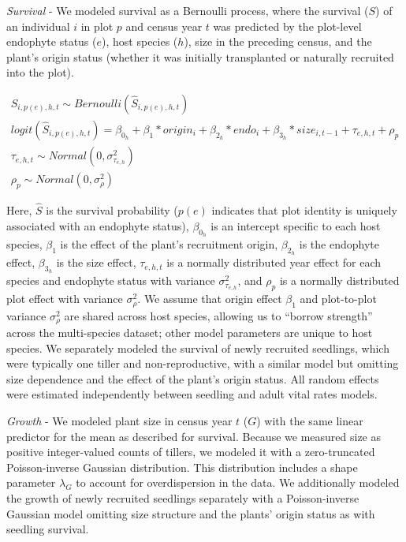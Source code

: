 \documentclass[12pt]{article}
\begin{document}
\emph{Survival} - We modeled survival as a Bernoulli process, where the survival ($S$) of an individual $i$ in plot $p$ and census year $t$ was predicted by the plot-level endophyte status ($e$), host species ($h$), size in the preceding census, and the plant's origin status (whether it was initially transplanted or naturally recruited into the plot).

\begin{subequations}
	\label{eq:survival}
	\begin{align}
	    S_{i,p(e),h,t} \sim Bernoulli(\hat{S}_{i,p(e),h,t})\\
	    logit(\hat{S}_{i,p(e),h,t}) = \beta_{0_{h}} + \beta_{1}*origin_{i} + \beta_{2_{h}}*endo_{i} + \beta_{3_{h}}*size_{i,t-1} + \tau_{e,h,t} + \rho_{p}\\
	    \tau_{e,h,t} \sim Normal(0,\sigma^2_{\tau_{e,h}})\\
	    \rho_{p} \sim Normal(0,\sigma^2_{\rho})
	\end{align}
\end{subequations}

Here, $\hat{S}$ is the survival probability ($p(e)$ indicates that plot identity is uniquely associated with an endophyte status), $\beta_{0_{h}}$ is an intercept specific to each host species, $\beta_1$ is the effect of the plant's recruitment origin, $\beta_{2_{h}}$ is the endophyte effect, $\beta_{3_{h}}$ is the size effect, $\tau_{e,h,t}$ is a normally distributed year effect for each species and endophyte status with variance $\sigma^2_{\tau_{e,h}}$, and $\rho_{p}$ is a normally distributed plot effect with variance $\sigma^2_{\rho}$.
We assume that origin effect $\beta_1$ and plot-to-plot variance $\sigma^2_{\rho}$ are shared across host species, allowing us to ``borrow strength'' across the multi-species dataset; other model parameters are unique to host species. 
We separately modeled the survival of newly recruited seedlings, which were typically one tiller and non-reproductive, with a similar model but omitting size dependence and the effect of the plant's origin status. 
All random effects were estimated independently between seedling and adult vital rates models.


\emph{Growth} - We modeled plant size in census year $t$ ($G$) with the same linear predictor for the mean as described for survival.
Because we measured size as positive integer-valued counts of tillers, we modeled it with a zero-truncated Poisson-inverse Gaussian distribution.
This distribution includes a shape parameter $\lambda_G$ to account for overdispersion in the data.
We additionally modeled the growth of newly recruited seedlings separately with a Poisson-inverse Gaussian model omitting size structure and the plants' origin status as with seedling survival.
\end{document}
